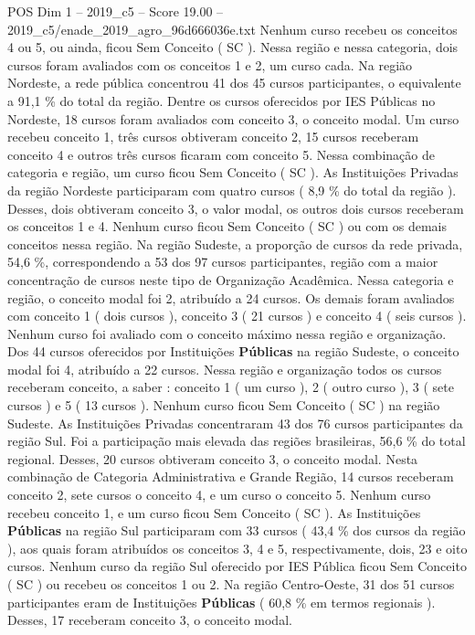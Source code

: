 \begin{textsample}{POS Dim 1 – 2019\_c5 – Score 19.00 – 2019\_c5/enade\_2019\_agro\_96d666036e.txt}
Nenhum curso recebeu os conceitos 4 ou 5, ou ainda, ficou Sem Conceito ( SC ).
Nessa região e nessa categoria, dois cursos foram avaliados com os conceitos 1 e 2, um curso cada.
Na região Nordeste, a rede pública concentrou 41 dos 45 cursos participantes, o equivalente a 91,1 \% do total da região.
Dentre os cursos oferecidos por IES Públicas no Nordeste, 18 cursos foram avaliados com conceito 3, o conceito modal.
Um curso recebeu conceito 1, três cursos obtiveram conceito 2, 15 cursos receberam conceito 4 e outros três cursos ficaram com conceito 5.
Nessa combinação de categoria e região, um curso ficou Sem Conceito ( SC ).
As Instituições Privadas da região Nordeste participaram com quatro cursos ( 8,9 \% do total da região ).
Desses, dois obtiveram conceito 3, o valor modal, os outros dois cursos receberam os conceitos 1 e 4.
Nenhum curso ficou Sem Conceito ( SC ) ou com os demais conceitos nessa região.
Na região Sudeste, a proporção de cursos da rede privada, 54,6 \%, correspondendo a 53 dos 97 cursos participantes, região com a maior concentração de cursos neste tipo de Organização Acadêmica.
Nessa categoria e região, o conceito modal foi 2, atribuído a 24 cursos.
Os demais foram avaliados com conceito 1 ( dois cursos ), conceito 3 ( 21 cursos ) e conceito 4 ( seis cursos ).
Nenhum curso foi avaliado com o conceito máximo nessa região e organização.
Dos 44 cursos oferecidos por Instituições \textbf{Públicas} na região Sudeste, o conceito modal foi 4, atribuído a 22 cursos.
Nessa região e organização todos os cursos receberam conceito, a saber : conceito 1 ( um curso ), 2 ( outro curso ), 3 ( sete cursos ) e 5 ( 13 cursos ).
Nenhum curso ficou Sem Conceito ( SC ) na região Sudeste.
As Instituições Privadas concentraram 43 dos 76 cursos participantes da região Sul.
Foi a participação mais elevada das regiões brasileiras, 56,6 \% do total regional.
Desses, 20 cursos obtiveram conceito 3, o conceito modal.
Nesta combinação de Categoria Administrativa e Grande Região, 14 cursos receberam conceito 2, sete cursos o conceito 4, e um curso o conceito 5.
Nenhum curso recebeu conceito 1, e um curso ficou Sem Conceito ( SC ).
As Instituições \textbf{Públicas} na região Sul participaram com 33 cursos ( 43,4 \% dos cursos da região ), aos quais foram atribuídos os conceitos 3, 4 e 5, respectivamente, dois, 23 e oito cursos.
Nenhum curso da região Sul oferecido por IES Pública ficou Sem Conceito ( SC ) ou recebeu os conceitos 1 ou 2.
Na região Centro-Oeste, 31 dos 51 cursos participantes eram de Instituições \textbf{Públicas} ( 60,8 \% em termos regionais ).
Desses, 17 receberam conceito 3, o conceito modal.

\end{textsample}
